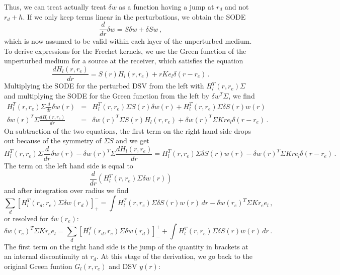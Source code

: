 \documentclass[11pt,a4paper]{article}
\begin{document}
Thus, we can treat actually treat $\delta w$ as a function having a jump at $r_d$ and not $r_d+h$.
If we only keep terms linear in the perturbations, we obtain the SODE
\begin{equation}
\frac{d}{dr}\delta w=S\delta w +\delta S w \,,
\end{equation}
which is now assumed to be valid within each layer of the unperturbed medium.
To derive expressions for the Frechet kernels, we use the Green function of the unperturbed medium for a source at the receiver, which satisfies the equation
\begin{equation}
\frac{dH_l(r,r_e)}{dr} = S(r)H_l(r,r_e)+rKe_l\delta(r-r_e) \,.
\end{equation}
Multiplying the SODE for the perturbed DSV from the left with $H_l^T(r,r_e)\Sigma$ and multiplying the SODE for the Green function from the left by $\delta w^T\Sigma$, we find
\begin{eqnarray}
H_l^T(r,r_e)\Sigma\frac{d}{dr}\delta w(r) & = & H_l^T(r,r_e)\Sigma S(r)\delta w(r) +H_l^T(r,r_e)\Sigma\delta S(r) w(r) \nonumber \\
\delta w(r)^T\Sigma\frac{dH_l(r,r_e)}{dr} & = & \delta w(r)^T\Sigma S(r)H_l(r,r_e)+\delta w(r)^T\Sigma Kre_l\delta(r-r_e) \,.
\end{eqnarray}
On subtraction of the two equations, the first term on the right hand side drops out because of the symmetry of $\Sigma S$ and we get
\begin{equation}
H_l^T(r,r_e)\Sigma\frac{d}{dr}\delta w(r)-\delta w(r)^T\Sigma\frac{dH_l(r,r_e)}{dr} = H_l^T(r,r_e)\Sigma\delta S(r) w(r) - \delta w(r)^T\Sigma Kre_l\delta(r-r_e) \,.
\end{equation}
The term on the left hand side is equal to
\begin{equation}
\frac{d}{dr}\left(H_l^T(r,r_e)\Sigma\delta w(r)\right)
\end{equation}
and after integration over radius we find
\begin{equation}
\sum_d\left[H_l^T(r_d,r_e)\Sigma\delta w(r_d)\right]^-_+ = \int H_l^T(r,r_e)\Sigma\delta S(r) w(r)\,dr - \delta w(r_e)^T\Sigma Kr_e e_l \,,
\end{equation}
or resolved for $\delta w(r_e)$:
\begin{equation}
\delta w(r_e)^T\Sigma Kr_e e_l = \sum_d\left[H_l^T(r_d,r_e)\Sigma\delta w(r_d)\right]^+_- +\int H_l^T(r,r_e)\Sigma\delta S(r) w(r)\,dr \,.
\end{equation}
The first term on the right hand side is the jump of the quantity in brackets at an internal discontinuity at $r_d$. At this stage of the derivation, we go back to the original Green funtion $G_l(r,r_e)$ and DSV $y(r)$:
\end{document}
